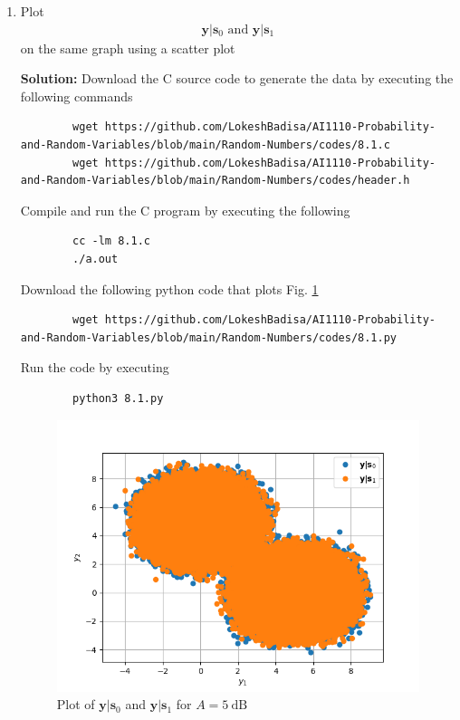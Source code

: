 \documentclass[journal,12pt,twocolumn]{IEEEtran}
\newcommand{\solution}{\noindent \textbf{Solution: }}
\providecommand{\mbf}{\mathbf}
\let\vec\mathbf
\numberwithin{equation}{section}
\renewcommand\thesection{\arabic{section}}
\begin{document}
	\begin{enumerate}[label=\thesection.\arabic*,ref=\thesection.\theenumi]
	\item Plot 
	\begin{align}
		\vec{y}|\vec{s}_0 \text{ and } \vec{y}|\vec{s}_1
	\end{align}
	on the same graph using a scatter plot
	
	\solution Download the C source code to generate the data by executing the following commands
	\begin{lstlisting}
		wget https://github.com/LokeshBadisa/AI1110-Probability-and-Random-Variables/blob/main/Random-Numbers/codes/8.1.c
		wget https://github.com/LokeshBadisa/AI1110-Probability-and-Random-Variables/blob/main/Random-Numbers/codes/header.h
	\end{lstlisting}
	Compile and run the C program by executing the following
	\begin{lstlisting}
		cc -lm 8.1.c
		./a.out
	\end{lstlisting}
	
	Download the following python code that plots Fig. \ref{fig-8.1} 
	\begin{lstlisting}
		wget https://github.com/LokeshBadisa/AI1110-Probability-and-Random-Variables/blob/main/Random-Numbers/codes/8.1.py
	\end{lstlisting}
	Run the code by executing
	\begin{lstlisting}
		python3 8.1.py
	\end{lstlisting}
	
	\begin{figure}
		\centering
		\includegraphics[width=\columnwidth]{./figs/8.1.png}
		\caption{Plot of $\mbf{y}|\mbf{s}_0$ and $\mbf{y}|\mbf{s}_1$ for $A = 5~\mathrm{dB}$}
		\label{fig-8.1}
	\end{figure}
	

\end{enumerate}
\end{document}
